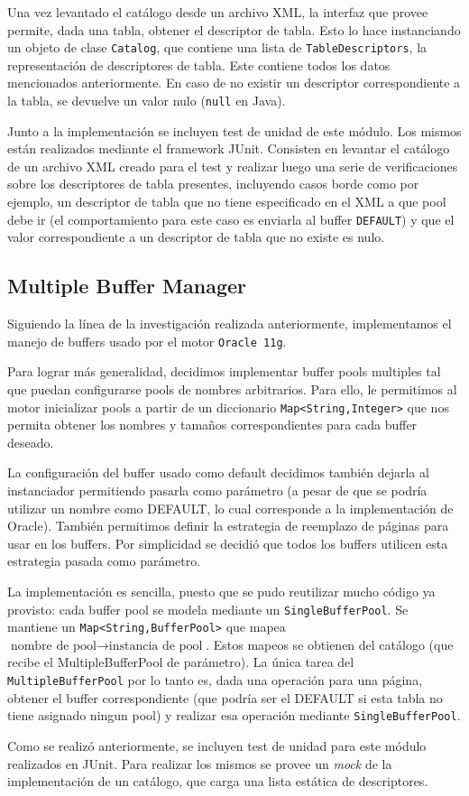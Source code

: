 Una vez levantado el cat\'alogo desde un archivo XML, la interfaz que provee permite, dada una tabla, obtener el descriptor de tabla. Esto lo hace instanciando un objeto de clase \texttt{Catalog}, que contiene una lista de \texttt{TableDescriptors}, la representaci\'on de descriptores de tabla. Este contiene todos los datos mencionados anteriormente. En caso de no existir un descriptor correspondiente a la tabla, se devuelve un valor nulo (\texttt{null} en Java).

Junto a la implementaci\'on se incluyen test de unidad de este m\'odulo. Los mismos est\'an realizados mediante el framework JUnit. Consisten en levantar el cat\'alogo
de un archivo XML creado para el test y realizar luego una serie de verificaciones sobre los descriptores de tabla presentes, incluyendo casos borde como por ejemplo, un
descriptor de tabla que no tiene especificado en el XML a que pool debe ir (el comportamiento para este caso es enviarla al buffer \texttt{DEFAULT}) y que el valor correspondiente a un descriptor de tabla que no existe es nulo.

\subsection{Multiple Buffer Manager}

Siguiendo la l\'inea de la investigaci\'on realizada anteriormente, implementamos el manejo de buffers usado por el motor \texttt{Oracle 11g}.

Para lograr m\'as generalidad, decidimos implementar buffer pools multiples tal que puedan configurarse pools de nombres arbitrarios. Para ello, le permitimos al motor
inicializar pools a partir de un diccionario \texttt{Map<String,Integer>} que nos permita obtener los nombres y tama\~nos correspondientes para cada buffer deseado.

La configuraci\'on del buffer usado como default decidimos tambi\'en dejarla al instanciador permitiendo pasarla como par\'ametro (a pesar de que se podr\'ia utilizar un nombre como DEFAULT, lo cual corresponde a la implementaci\'on de Oracle). Tambi\'en permitimos definir la estrategia de reemplazo de p\'aginas para usar en los buffers. Por simplicidad se decidi\'o que todos los buffers utilicen esta estrategia pasada como par\'ametro.

La implementaci\'on es sencilla, puesto que se pudo reutilizar mucho c\'odigo ya provisto: cada buffer pool se modela mediante un \texttt{SingleBufferPool}. Se mantiene
un \texttt{Map<String,BufferPool>} que mapea $\text{nombre de pool} \rightarrow \text{instancia de pool}$. Estos mapeos se obtienen del cat\'alogo (que recibe el MultipleBufferPool de par\'ametro). La \'unica tarea del \texttt{MultipleBufferPool} por lo tanto es, dada una operaci\'on para una p\'agina, obtener el buffer correspondiente (que podría ser el DEFAULT si esta tabla no tiene asignado ningun pool) y realizar esa operaci\'on mediante \texttt{SingleBufferPool}.

Como se realizó anteriormente, se incluyen test de unidad para este m\'odulo realizados en JUnit. Para realizar los mismos se provee un \textit{mock} de la implementaci\'on de un cat\'alogo, que carga una lista est\'atica de descriptores.

